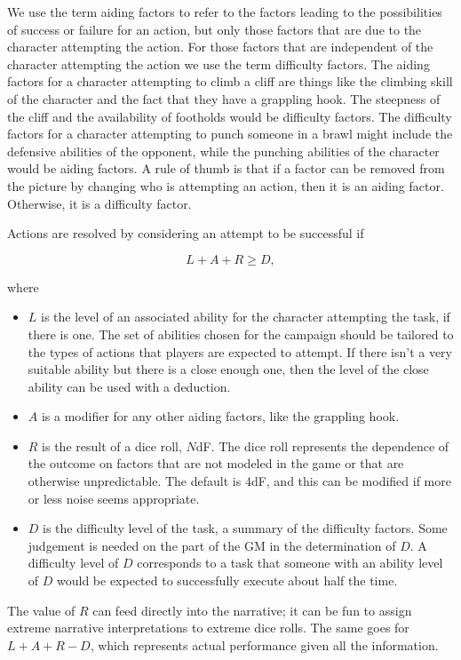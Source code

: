 We use the term aiding factors to refer to the factors leading to the possibilities of success or failure for an action,
but only those factors that are due to the character attempting the action.
For those factors that are independent of the character attempting the action we use the term difficulty factors.
The aiding factors for a character attempting to climb a cliff are things like the climbing skill of the character and the fact that they have a grappling hook.
The steepness of the cliff and the availability of footholds would be difficulty factors.
The difficulty factors for a character attempting to punch someone in a brawl might include the defensive abilities of the opponent,
while the punching abilities of the character would be aiding factors.
A rule of thumb is that if a factor can be removed from the picture by changing who is attempting an action, then it is an aiding factor.
Otherwise, it is a difficulty factor.

Actions are resolved by considering an attempt to be successful if

$$L + A + R \geq D,$$

where
\begin{itemize}
\item
$L$ is the level of an associated ability for the character attempting the task, if there is one.
The set of abilities chosen for the campaign should be tailored to the types of actions that players are expected to attempt.
If there isn’t a very suitable ability but there is a close enough one, then the level of the close ability can be used with a deduction. 
\item
$A$ is a modifier for any other aiding factors, like the grappling hook.
\item
$R$ is the result of a dice roll, $N$dF.
The dice roll represents the dependence of the outcome on factors that are not modeled in the game or that are otherwise unpredictable.
The default is $4$dF, and this can be modified if more or less noise seems appropriate.
\item
$D$ is the difficulty level of the task, a summary of the difficulty factors.
Some judgement is needed on the part of the GM in the determination of $D$.
A difficulty level of $D$ corresponds to a task that someone with an ability level of $D$ would be expected to successfully execute about half the time.
\end{itemize}

The value of $R$ can feed directly into the narrative; it can be fun to assign extreme narrative interpretations to extreme dice rolls.
The same goes for $L + A + R - D$, which represents actual performance given all the information.

